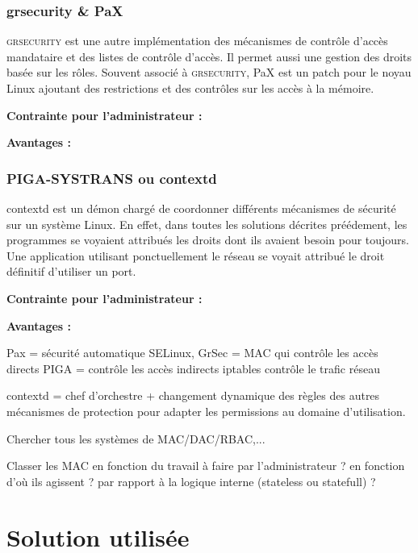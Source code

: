 \subsubsection{grsecurity \& PaX}

\textsc{grsecurity} est une autre implémentation des mécanismes de contrôle d'accès mandataire et des listes de contrôle d'accès. Il permet aussi une gestion des droits basée sur les rôles. Souvent associé à \textsc{grsecurity}, PaX est un patch pour le noyau Linux ajoutant des restrictions et des contrôles sur les accès à la mémoire.

\begin{list}{}{}
 \item \textbf{Contrainte pour l'administrateur :}
 \item \textbf{Avantages :}
\end{list}

\subsubsection{PIGA-SYSTRANS ou contextd}

contextd est un démon chargé de coordonner différents mécanismes de sécurité sur un système Linux. En effet, dans toutes les solutions décrites préédement, les programmes se voyaient attribués les droits dont ils avaient besoin pour toujours. Une application utilisant ponctuellement le réseau se voyait attribué le droit définitif d'utiliser un port.

\begin{list}{}{}
 \item \textbf{Contrainte pour l'administrateur :}
 \item \textbf{Avantages :}
\end{list}

Pax = sécurité automatique
SELinux, GrSec = MAC qui contrôle les accès directs
PIGA = contrôle les accès indirects
iptables contrôle le trafic réseau

contextd = chef d'orchestre + changement dynamique des règles des autres  mécanismes de protection pour adapter les permissions au domaine d'utilisation.

Chercher tous les systèmes de MAC/DAC/RBAC,...

Classer les MAC en fonction du travail à faire par l'administrateur ? en fonction d'où ils agissent ? par rapport à la logique interne (stateless ou statefull) ?

\newpage

\section{Solution utilisée}

